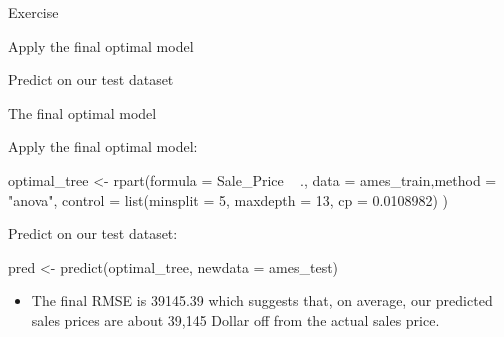 \documentclass[
  10pt,
  ignorenonframetext,
]{beamer}
\newenvironment{Shaded}{}{}
\newcommand{\DataTypeTok}[1]{#1}
\newcommand{\DecValTok}[1]{#1}
\newcommand{\FloatTok}[1]{#1}
\newcommand{\KeywordTok}[1]{\textcolor[rgb]{0.00,0.00,1.00}{#1}}
\newcommand{\NormalTok}[1]{#1}
\newcommand{\OperatorTok}[1]{#1}
\newcommand{\StringTok}[1]{\textcolor[rgb]{0.00,0.50,0.50}{#1}}
\providecommand{\tightlist}{%
  \setlength{\itemsep}{0pt}\setlength{\parskip}{0pt}}
\begin{document}
\begin{frame}{Exercise}
\protect\hypertarget{exercise}{}

\begin{block}{Apply the final optimal model}

\end{block}

\begin{block}{Predict on our test dataset}

\end{block}

\end{frame}

\begin{frame}[fragile]{The final optimal model}
\protect\hypertarget{the-final-optimal-model}{}

\begin{block}{Apply the final optimal model:}

\begin{Shaded}
\begin{Highlighting}[]
\NormalTok{optimal_tree <-}\StringTok{ }\KeywordTok{rpart}\NormalTok{(}\DataTypeTok{formula =}\NormalTok{ Sale_Price }\OperatorTok{~}\StringTok{ }\NormalTok{.,}
    \DataTypeTok{data    =}\NormalTok{ ames_train,}\DataTypeTok{method  =} \StringTok{"anova"}\NormalTok{,}
    \DataTypeTok{control =} \KeywordTok{list}\NormalTok{(}\DataTypeTok{minsplit =} \DecValTok{5}\NormalTok{, }\DataTypeTok{maxdepth =} \DecValTok{13}\NormalTok{, }\DataTypeTok{cp =} \FloatTok{0.0108982}\NormalTok{)}
\NormalTok{    )}
\end{Highlighting}
\end{Shaded}

\end{block}

\begin{block}{Predict on our test dataset:}

\begin{Shaded}
\begin{Highlighting}[]
\NormalTok{pred <-}\StringTok{ }\KeywordTok{predict}\NormalTok{(optimal_tree, }\DataTypeTok{newdata =}\NormalTok{ ames_test)}
\end{Highlighting}
\end{Shaded}

\begin{itemize}
\tightlist
\item
  The final RMSE is 39145.39 which suggests that, on average, our
  predicted sales prices are about 39,145 Dollar off from the actual
  sales price.
\end{itemize}


\end{block}
\end{frame}
\end{document}

